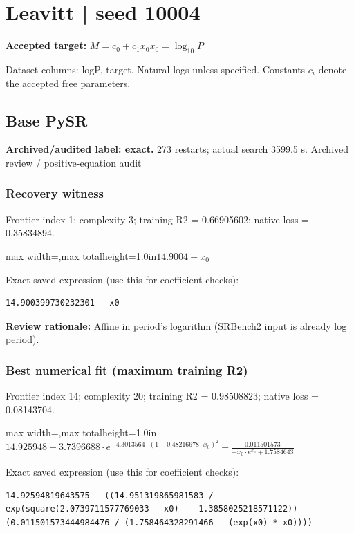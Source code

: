 \documentclass[10pt,letterpaper,landscape]{article}
\begin{document}
\section*{Leavitt | seed 10004}
\textbf{Accepted target:} $\displaystyle M=c_0+c_1x_0$\hfill $x_0=\log_{10}P$\par
{\small Dataset columns: logP, target. Natural logs unless specified. Constants $c_i$ denote the accepted free parameters.}\par\medskip
\begin{minipage}[t]{0.485\textwidth}
\subsection*{Base PySR}
\textbf{Archived/audited label: exact.} 273 restarts; actual search 3599.5 s.
{\small Archived review / positive-equation audit}
\subsubsection*{Recovery witness}
Frontier index 1; complexity 3; training R2 = 0.66905602; native loss = 0.35834894.
\begin{center}\begin{adjustbox}{max width=\linewidth,max totalheight=1.0in}$\displaystyle 14.9004 - x_{0}$\end{adjustbox}\end{center}
{\scriptsize Exact saved expression (use this for coefficient checks):}
\begin{lstlisting}
14.900399730232301 - x0
\end{lstlisting}
{\small\textbf{Review rationale:} Affine in period's logarithm (SRBench2 input is already log period).}
\subsubsection*{Best numerical fit (maximum training R2)}
Frontier index 14; complexity 20; training R2 = 0.98508823; native loss = 0.08143704.
\begin{center}\begin{adjustbox}{max width=\linewidth,max totalheight=1.0in}$\displaystyle 14.925948 - 3.7396688 \cdot e^{- 4.3013564 \cdot \left(1 - 0.48216678 \cdot x_{0}\right)^{2}} + \frac{0.011501573}{- x_{0} \cdot e^{x_{0}} + 1.7584643}$\end{adjustbox}\end{center}
{\scriptsize Exact saved expression (use this for coefficient checks):}
\begin{lstlisting}
14.92594819643575 - ((14.951319865981583 / exp(square(2.0739711577769033 - x0) - -1.3858025218571122)) - (0.011501573444984476 / (1.758464328291466 - (exp(x0) * x0))))
\end{lstlisting}
\end{minipage}\hfill
\end{document}
